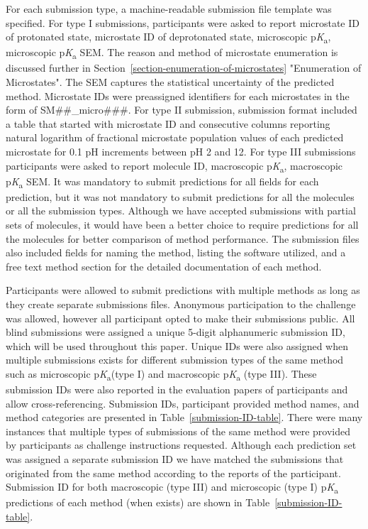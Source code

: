 \documentclass[9pt,lineno,final]{elife}
\newcommand{\pKa}{p\textit{K}\textsubscript{a}}
\begin{document}
For each submission type, a machine-readable submission file template was specified. 
For type I submissions, participants were asked to report microstate ID of protonated state, microstate ID of deprotonated state, microscopic \pKa{}, microscopic \pKa{} SEM.  The reason and method of microstate enumeration is discussed further in Section~\ref{section-enumeration-of-microstates} "Enumeration of Microstates".
The SEM captures the statistical uncertainty of the predicted method. 
Microstate IDs were preassigned identifiers for each microstates in the form of SM\#\#\_micro\#\#\#. 
For type II submission, submission format included a table that started with microstate ID and consecutive columns reporting natural logarithm of fractional microstate population values of each predicted microstate for 0.1 pH increments between pH 2 and 12.
For type III submissions participants were asked to report molecule ID, macroscopic \pKa{}, macroscopic \pKa{} SEM.  
It was mandatory to submit predictions for all fields for each prediction, but it was not mandatory to submit predictions for all the molecules or all the submission types. 
Although we have accepted submissions with partial sets of molecules, it would have been a better choice to require predictions for all the  molecules for better comparison of method performance. 
The submission files also included fields for naming the method, listing the software utilized, and a free text method section for the detailed documentation of each method. 

Participants were allowed to submit predictions with multiple methods as long as they create separate submissions files. Anonymous participation to the challenge was allowed, however all participant opted to make their submissions public.
All blind submissions were assigned a unique 5-digit alphanumeric submission ID, which will be used throughout this paper. Unique IDs were also assigned when multiple submissions exists for different submission types of the same method such as microscopic \pKa{}(type I) and macroscopic \pKa{} (type III). 
These submission IDs were also reported in the evaluation papers of participants and allow cross-referencing. Submission IDs, participant provided method names, and method categories are presented in Table~\ref{submission-ID-table}. 
There were many instances that multiple types of submissions of the same method were provided by participants as challenge instructions requested. 
Although each prediction set was assigned a separate submission ID we have matched the submissions that originated from the same method according to the reports of the participant.
Submission ID for both macroscopic (type III) and microscopic (type I) \pKa{} predictions of each method (when exists) are shown in Table~\ref{submission-ID-table}. 
\end{document}
